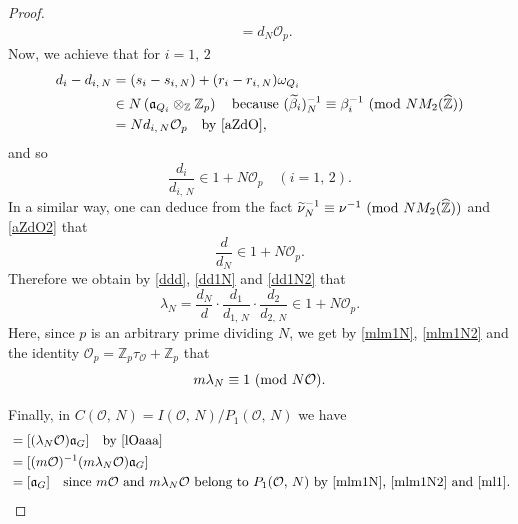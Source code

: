 \documentclass[reqno,11pt]{article}
\newcommand{\Mod}[1]{\ (\textup{mod}\ #1)}
\theoremstyle{plain} %
\theoremstyle{definition} %
\begin{document}
\begin{proof}
\begin{align}
 &=d_N\mathcal{O}_p.\label{aZdO2}
\end{align}
Now, we achieve that for $i=1,\,2$
\begin{align*}
d_i-d_{i,\,N}&=(s_i-s_{i,\,N})+(r_i-r_{i,\,N})\omega_{Q_i}\\
&\in N\left(\mathfrak{a}_{Q_i}\otimes_{\mathbb{Z}}\mathbb{Z}_p\right)
\quad\textrm{because}~(\widetilde{\beta}_i)_N^{-1}\equiv\beta_i^{-1}
\Mod{NM_2(\widehat{\mathbb{Z}})}\\
&=Nd_{i,\,N}\mathcal{O}_p\quad\textrm{by \eqref{aZdO}},
\end{align*}
and so
\begin{equation}\label{dd1N}
 \frac{d_i}{d_{i,\,N}}
 \in 1+N\mathcal{O}_p\quad (i=1,\,2).
\end{equation}
In a similar way, one can deduce from the fact 
$\widetilde{\nu}_N^{-1}\equiv\nu^{-1}\Mod{NM_2(\widehat{\mathbb{Z}})}$ and 
\eqref{aZdO2} that
\begin{equation}\label{dd1N2}
 \frac{d}{d_N}\in 1+N\mathcal{O}_p.
\end{equation}
Therefore we obtain by \eqref{ddd}, \eqref{dd1N} and \eqref{dd1N2} that
\begin{equation*}
\lambda_N=\frac{d_N}{d}\cdot\frac{d_1}{d_{1,\,N}}
\cdot\frac{d_2}{d_{2,\,N}}\in 1+N\mathcal{O}_p.
\end{equation*}
Here, since $p$ is an arbitrary prime dividing $N$, we get by \eqref{mlm1N}, \eqref{mlm1N2} and the identity
$\mathcal{O}_p=\mathbb{Z}_p\tau_\mathcal{O}+\mathbb{Z}_p$ that
\begin{equation}\label{ml1}
 m\lambda_N\equiv1\Mod{N\mathcal{O}}.
\end{equation}
\par
Finally, in $C(\mathcal{O},\,N)=I(\mathcal{O},\,N)/P_1(\mathcal{O},\,N)$ we have
\begin{align*}
[\mathfrak{a}_{F_1}\mathfrak{a}_{F_2}]
&=[(\lambda_N\mathcal{O})\mathfrak{a}_G]\quad\textrm{by \eqref{lOaaa}}\\
&=[(m\mathcal{O})^{-1}(m\lambda_N\mathcal{O})\mathfrak{a}_G]\\
&=[\mathfrak{a}_G]
\quad\textrm{since $m\mathcal{O}$  and $m\lambda_N\mathcal{O}$ belong to $P_1(\mathcal{O},\,N)$ by \eqref{mlm1N}, \eqref{mlm1N2} and \eqref{ml1}}. 
\end{align*}
\end{proof}
\end{document}
